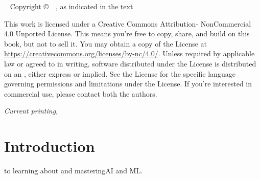 
\frontmatter

\blankpage


\maketitle


\newpage
\begin{fullwidth}
~\vfill
\thispagestyle{empty}
Copyright \copyright\ \the\year\ \thanklessauthor, as indicated in the text


\par{}

\par
This work is licensed under a Creative Commons Attribution-
NonCommercial 4.0 Unported License. This means you're free to
copy, share, and build on this book, but not to sell it. 
You may obtain a copy
of the License at \url{https://creativecommons.org/licenses/by-nc/4.0/}. Unless
required by applicable law or agreed to in writing, software distributed
under the License is distributed on an , either express or implied. See the
License for the specific language governing permissions and limitations
under the License.
If you're interested in commercial use, please contact both the authors.

\par\textit{Current printing, \monthyear}
\end{fullwidth}

\tableofcontents

\listoffigures





\mainmatter

\chapter*{Introduction}


 to learning about and mastering\ac{AI} and  \ac{ML}.  

